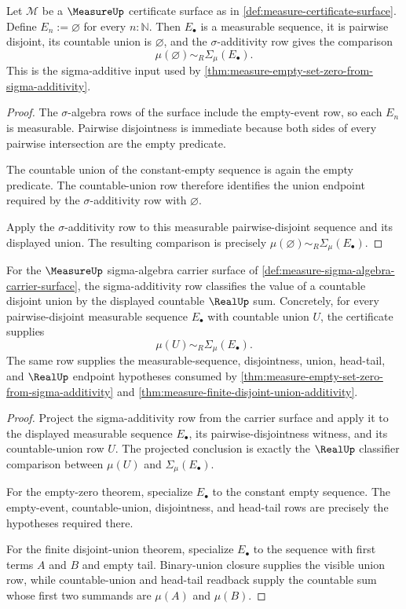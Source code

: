 \begin{theorem}
\label{thm:measure-obligation-sigma-additive-row}
Let $\mathcal{M}$ be a $\MeasureUp$ certificate surface as in \autoref{def:measure-certificate-surface}. Define $E_n:=\varnothing$ for every $n:\mathbb{N}$. Then $E_\bullet$ is a measurable sequence, it is pairwise disjoint, its countable union is $\varnothing$, and the $\sigma$-additivity row gives the comparison
$$
\mu(\varnothing)\sim_R\Sigma_\mu(E_\bullet).
$$
This is the sigma-additive input used by \autoref{thm:measure-empty-set-zero-from-sigma-additivity}.
\end{theorem}
\begin{proof}
The $\sigma$-algebra rows of the surface include the empty-event row, so each $E_n$ is measurable. Pairwise disjointness is immediate because both sides of every pairwise intersection are the empty predicate.

The countable union of the constant-empty sequence is again the empty predicate. The countable-union row therefore identifies the union endpoint required by the $\sigma$-additivity row with $\varnothing$.

Apply the $\sigma$-additivity row to this measurable pairwise-disjoint sequence and its displayed union. The resulting comparison is precisely $\mu(\varnothing)\sim_R\Sigma_\mu(E_\bullet)$.
\end{proof}

\begin{theorem}
\label{thm:measure-sigma-additivity-obligation}
For the $\MeasureUp$ sigma-algebra carrier surface of
\autoref{def:measure-sigma-algebra-carrier-surface}, the sigma-additivity row
classifies the value of a countable disjoint union by the displayed countable
$\RealUp$ sum. Concretely, for every pairwise-disjoint measurable sequence
$E_\bullet$ with countable union $U$, the certificate supplies
$$
\mu(U)\sim_R\Sigma_\mu(E_\bullet).
$$
The same row supplies the measurable-sequence, disjointness, union, head-tail,
and $\RealUp$ endpoint hypotheses consumed by
\autoref{thm:measure-empty-set-zero-from-sigma-additivity} and
\autoref{thm:measure-finite-disjoint-union-additivity}.
\end{theorem}
\begin{proof}
Project the sigma-additivity row from the carrier surface and apply it to the
displayed measurable sequence $E_\bullet$, its pairwise-disjointness witness,
and its countable-union row $U$. The projected conclusion is exactly the
$\RealUp$ classifier comparison between $\mu(U)$ and
$\Sigma_\mu(E_\bullet)$.

For the empty-zero theorem, specialize $E_\bullet$ to the constant empty
sequence. The empty-event, countable-union, disjointness, and head-tail rows
are precisely the hypotheses required there.

For the finite disjoint-union theorem, specialize $E_\bullet$ to the sequence
with first terms $A$ and $B$ and empty tail. Binary-union closure supplies the
visible union row, while countable-union and head-tail readback supply the
countable sum whose first two summands are $\mu(A)$ and $\mu(B)$.
\end{proof}


